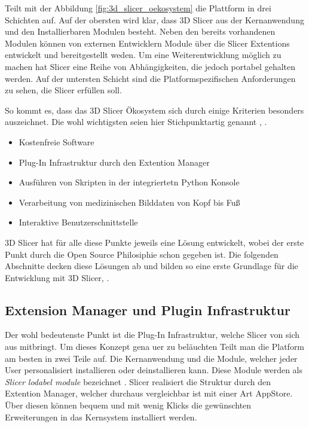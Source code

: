 \citet[Seite 1326]{fedorov2012slicer} Teilt mit der Abbildung \ref{fig:3d_slicer_oekosystem}
die Plattform in drei Schichten auf. Auf der obersten wird klar, dass 3D Slicer aus
der Kernanwendung und den Installierbaren Modulen besteht. Neben den bereits
vorhandenen Modulen können von externen Entwicklern Module über die Slicer
Extentions entwickelt und bereitgestellt weden. Um eine Weiterentwicklung möglich
zu machen hat Slicer eine Reihe von Abhängigkeiten, die jedoch portabel gehalten
werden. Auf der untersten Schicht sind die Platformspezifischen Anforderungen zu
sehen, die Slicer erfüllen soll.

So kommt es, dass das 3D Slicer Ökosystem sich durch einige Kriterien besonders auszeichnet.
Die wohl wichtigsten seien hier Stichpunktartig genannt \citep[vgl.][]{slicer2024},
\citep[vgl.][]{fedorov2012slicer}.

\begin{itemize}
	\item Kostenfreie Software

	\item Plug-In Infrastruktur durch den Extention Manager

	\item Ausführen von Skripten in der integriertetn Python Konsole

	\item Verarbeitung von medizinischen Bilddaten von Kopf bis Fuß

	\item Interaktive Benutzerschnittstelle
\end{itemize}

3D Slicer hat für alle diese Punkte jeweils eine Lösung entwickelt, wobei der erste
Punkt durch die Open Source Philosiphie schon gegeben ist. Die folgenden
Abschnitte decken diese Lösungen ab und bilden so eine erste Grundlage für die
Entwicklung mit 3D Slicer\citep[vgl.][]{slicer2024}, \citep[vgl.][]{fedorov2012slicer}.

\subsection{Extension Manager und Plugin Infrastruktur}
Der wohl bedeutenste Punkt ist die Plug-In Infrastruktur, welche Slicer von sich
aus mitbringt. Um dieses Konzept gena uer zu beläuchten Teilt man die Platform
am besten in zwei Teile auf. Die Kernanwendung und die Module, welcher jeder
User personalisiert installieren oder deinstallieren kann. Diese Module werden als
\textit{Slicer lodabel module} bezeichnet \citep[vgl.][Seite 1332]{fedorov2012slicer}.
Slicer realisiert die Struktur durch den Extention Manager, welcher durchaus
vergleichbar ist mit einer Art AppStore. Über diesen können bequem und mit wenig
Klicks die gewünschten Erweiterungen in das Kernsystem installiert werden.

